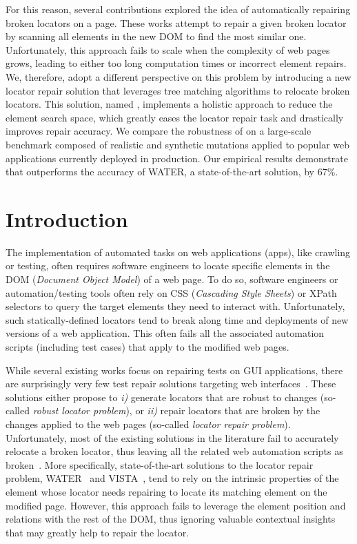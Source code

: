 For this reason, several contributions explored the idea of automatically repairing broken locators on a page. 
These works attempt to repair a given broken locator by scanning all elements in the new DOM to find the most similar one.
Unfortunately, this approach fails to scale when the complexity of web pages grows, leading to either too long computation times or incorrect element repairs.
% 
We, therefore, adopt a different perspective on this problem by introducing a new locator repair solution that leverages tree matching algorithms to relocate broken locators.
This solution, named \erratum{}, implements a holistic approach to reduce the element search space, which greatly eases the locator repair task and drastically improves repair accuracy.
% 
We compare the robustness of \erratum{} on a large-scale benchmark composed of realistic and synthetic mutations applied to popular web applications currently deployed in production.
Our empirical results demonstrate that \erratum{} outperforms the accuracy of WATER, a state-of-the-art solution, by 67\%.

\section{Introduction}
The implementation of automated tasks on web applications (apps), like crawling or testing, often requires software engineers to locate specific elements in the DOM (\emph{Document Object Model}) of a web page.
To do so, software engineers or automation/testing tools often rely on CSS (\emph{Cascading Style Sheets}) or XPath selectors to query the target elements they need to interact with.
Unfortunately, such statically-defined locators tend to break along time and deployments of new versions of a web application.
This often fails all the associated automation scripts (including test cases) that apply to the modified web pages.

While several existing works focus on repairing tests on GUI applications, there are surprisingly very few test repair solutions targeting web interfaces~\cite{imtiaz2019systematic}.
These solutions either propose to \emph{i)} generate locators that are robust to changes (so-called \emph{robust locator problem}), or \emph{ii)} repair locators that are broken by the changes applied to the web pages (so-called \emph{locator repair problem}).
Unfortunately, most of the existing solutions in the literature fail to accurately relocate a broken locator, thus leaving all the related web automation scripts as broken~\cite{hammoudi2016record}.
% 
More specifically, state-of-the-art solutions to the locator repair problem, WATER~\cite{choudhary2011water} and VISTA~\cite{stocco2018visual}, tend to rely on the intrinsic properties of the element whose locator needs repairing to locate its matching element on the modified page. 
However, this approach fails to leverage the element position and relations with the rest of the DOM, thus ignoring valuable contextual insights that may greatly help to repair the locator.

